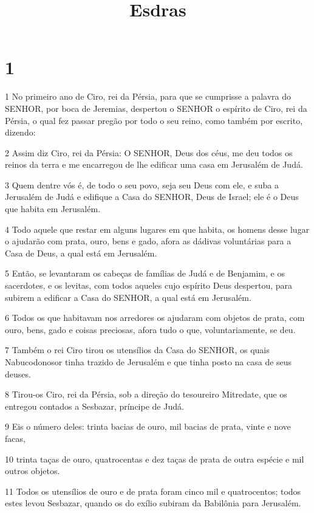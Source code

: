 

\title{Esdras}


\chapter{1}

\par 1 No primeiro ano de Ciro, rei da Pérsia, para que se cumprisse a palavra do SENHOR, por boca de Jeremias, despertou o SENHOR o espírito de Ciro, rei da Pérsia, o qual fez passar pregão por todo o seu reino, como também por escrito, dizendo:
\par 2 Assim diz Ciro, rei da Pérsia: O SENHOR, Deus dos céus, me deu todos os reinos da terra e me encarregou de lhe edificar uma casa em Jerusalém de Judá.
\par 3 Quem dentre vós é, de todo o seu povo, seja seu Deus com ele, e suba a Jerusalém de Judá e edifique a Casa do SENHOR, Deus de Israel; ele é o Deus que habita em Jerusalém.
\par 4 Todo aquele que restar em alguns lugares em que habita, os homens desse lugar o ajudarão com prata, ouro, bens e gado, afora as dádivas voluntárias para a Casa de Deus, a qual está em Jerusalém.
\par 5 Então, se levantaram os cabeças de famílias de Judá e de Benjamim, e os sacerdotes, e os levitas, com todos aqueles cujo espírito Deus despertou, para subirem a edificar a Casa do SENHOR, a qual está em Jerusalém.
\par 6 Todos os que habitavam nos arredores os ajudaram com objetos de prata, com ouro, bens, gado e coisas preciosas, afora tudo o que, voluntariamente, se deu.
\par 7 Também o rei Ciro tirou os utensílios da Casa do SENHOR, os quais Nabucodonosor tinha trazido de Jerusalém e que tinha posto na casa de seus deuses.
\par 8 Tirou-os Ciro, rei da Pérsia, sob a direção do tesoureiro Mitredate, que os entregou contados a Sesbazar, príncipe de Judá.
\par 9 Eis o número deles: trinta bacias de ouro, mil bacias de prata, vinte e nove facas,
\par 10 trinta taças de ouro, quatrocentas e dez taças de prata de outra espécie e mil outros objetos.
\par 11 Todos os utensílios de ouro e de prata foram cinco mil e quatrocentos; todos estes levou Sesbazar, quando os do exílio subiram da Babilônia para Jerusalém.

